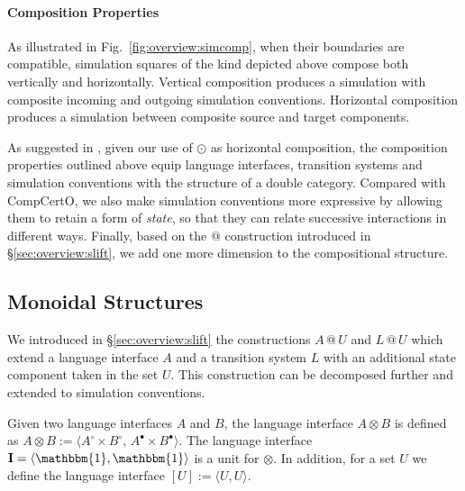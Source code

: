 \documentclass[acmsmall,screen,review,anonymous]{acmart}
\newcommand{\que}{\circ}
\newcommand{\ans}{\bullet}
\begin{document}
\paragraph{Composition Properties} \label{sec:overview:doublecat} %

As illustrated in Fig.~\ref{fig:overview:simcomp},
when their boundaries are compatible,
simulation squares of the kind depicted above compose both
vertically and horizontally.
Vertical composition produces a simulation
with composite incoming and outgoing simulation conventions.
Horizontal composition produces a simulation
between composite source and target components.

As suggested in \citet{compcerto},
given our use of $\odot$ as horizontal composition,
the composition properties outlined above
equip language interfaces,
transition systems and
simulation conventions
with the structure of a double category.
Compared with CompCertO,
we also make simulation conventions more expressive
by allowing them to retain a form of \emph{state},
so that they can relate successive interactions
in different ways.
Finally,
based on the $\mathbin@$ construction introduced in \S\ref{sec:overview:slift},
we add one more dimension to the compositional structure.



\subsection{Monoidal Structures} \label{sec:overview:mon} %

We introduced in \S\ref{sec:overview:slift}
the constructions $A \mathbin@ U$ and $L \mathbin@ U$
which extend a language interface $A$ and a transition system $L$
with an additional state component taken in the set $U$.
This construction can be decomposed further
and extended to simulation conventions.

\begin{definition} \label{def:litens} %
Given two language interfaces $A$ and $B$,
the language interface $A \otimes B$ is defined as
$
  A \otimes B :=
    \langle A^\que \times B^\que, \,
            A^\ans \times B^\ans \rangle
$.
The language interface
$\mathbf{I} = \langle \mathbbm{1}, \mathbbm{1} \rangle$
is a unit for $\otimes$.
In addition, for a set $U$
we define the language interface
$[U] := \langle U, U \rangle$.
\end{definition}
\end{document}
